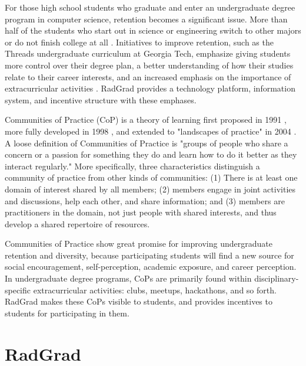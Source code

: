 \documentclass[acmsmall]{acmart}
\begin{document}
For those high school students who graduate and enter an undergraduate degree program in computer science, retention becomes a significant issue.   More than half of the students who start out in science or engineering switch to other majors or do not finish college at all \cite{kober_reaching_2015}. Initiatives to improve retention, such as the Threads undergraduate curriculum at Georgia Tech, emphasize giving students more control over their degree plan, a better understanding of how their studies relate to their career interests, and an increased emphasis on the importance of extracurricular activities \cite{barrett_expanding_2017}. RadGrad provides a technology platform, information system, and incentive structure with these emphases.

Communities of Practice (CoP) is a theory of learning first proposed in 1991 \cite{lave_situated_1991}, more fully developed in 1998 \cite{wenger_communities_1998}, and extended to "landscapes of practice" in 2004 \cite{wenger_learning_2004}. A loose definition of Communities of Practice is "groups of people who share a concern or a passion for something they do and learn how to do it better as they interact regularly." More specifically, three characteristics distinguish a community of practice from other kinds of communities: (1) There is at least one domain of interest shared by all members; (2) members engage in joint activities and discussions, help each other, and share information;  and (3) members are practitioners in the domain, not just people with shared interests, and thus develop a shared repertoire of resources.

Communities of Practice show great promise for improving undergraduate retention and diversity, because participating students will find a new source for social encouragement, self-perception, academic exposure, and career perception. In undergraduate degree programs, CoPs are primarily found within disciplinary-specific extracurricular activities: clubs, meetups, hackathons, and so forth. RadGrad makes these CoPs visible to students, and provides incentives to students for participating in them.

\section{RadGrad}
\label{sec:radgrad}
\end{document}
